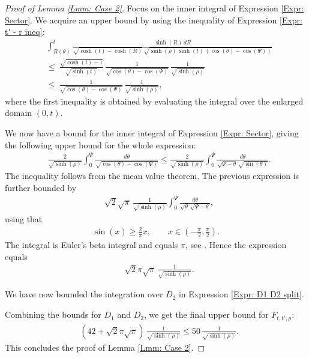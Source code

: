\documentclass[11pt,twoside,reqno]{amsart} \usepackage{a4wide} \usepackage[T1]{fontenc} \usepackage[utf8]{inputenc} \usepackage{soul}  \usepackage{amsmath} \usepackage{amsfonts} \usepackage{amssymb} \usepackage{mathtools} \usepackage{amsthm} \usepackage{xcolor} \usepackage{graphicx} \usepackage{hyperref} \usepackage{standalone} \usepackage{esint} \usepackage{comment} \usepackage[left=2.3cm,top=3cm,right=2.3cm]{geometry} \usepackage{bm} \usepackage{svg} \usepackage{float} \numberwithin{equation}{section} \theoremstyle{plain} \newtheorem{thm}{Theorem}[section] \newtheorem{theorem}[thm]{Theorem} \newtheorem*{theorem*}{Theorem}\newtheorem{conj}[thm]{Conjecture} \newtheorem{lemma}[thm]{Lemma} \newtheorem{prop}[thm]{Proposition} \newtheorem{proposition}[thm]{Proposition} \newtheorem{cor}[thm]{Corollary} \newtheorem{question}[thm]{Question} \newtheorem{corollary}[thm]{Corollary} \newtheorem{assumption}[thm]{Assumption} \theoremstyle{definition} \newtheorem{defn}[thm]{Definition} \newtheorem{choice}[thm]{Choice} \newtheorem{definition}[thm]{Definition} \newtheorem{ex}[thm]{Example} \newtheorem{notation}[thm]{Notation} \newtheorem*{ack}{Acknowledgements} \theoremstyle{remark} \newtheorem{remark}[thm]{Remark} \newtheorem{bigremark}[thm]{Remark} \usepackage{xcolor} \newcommand{\red}[1]{ {\color{Red}#1} } \newcommand{\blue}[1]{ {\color{Blue}#1} } \author{Kai Hippi} \address{Aalto University, Espoo, Finland} \email{kai.hippi@aalto.fi}
\begin{document}
\begin{proof}[Proof of Lemma \ref{Lmm: Case 2}]
Focus on the inner integral of Expression \eqref{Expr: Sector}. We acquire an upper bound by using the inequality of Expression \eqref{Expr: t' - r ineq}:
\begin{align*}
	&
	\int_{ R( \theta ) }^{ t } \frac{ \sinh( R ) \, dR }{ \sqrt{ \cosh( t ) - \cosh( R ) } \, \sqrt{ \sinh( \rho ) \, \sinh( t ) \, ( \cos( \theta ) - \cos( \Psi ) ) } } 
	\\
	& \leq \ 
	\frac{  \sqrt{ \cosh( t ) - 1 } }{ \sqrt{ \sinh( t ) } } \, \frac{1}{\sqrt{ \cos( \theta ) - \cos( \Psi ) }} \, \frac{1}{\sqrt{ \sinh( \rho )}}
	\\
	& \leq \
	\frac{1}{\sqrt{ \cos( \theta ) - \cos( \Psi ) }} \, \frac{1}{\sqrt{ \sinh( \rho ) }},
\end{align*}
where the first inequality is obtained by evaluating the integral over the enlarged domain $ (0,t) $.

We now have a bound for the inner integral of Expression \eqref{Expr: Sector}, giving the following upper bound for the whole expression:
\begin{align*}
	&
	\frac{2}{\sqrt{ \sinh( \rho ) }} \int_{0}^{\Psi} \frac{d\theta}{ \sqrt{ \cos( \theta ) - \cos( \Psi ) } } \leq \frac{2}{\sqrt{ \sinh( \rho ) }} \int_{0}^{\Psi} \frac{ d\theta }{ \sqrt{ \Psi - \theta } \, \sqrt{ \sin( \theta ) } } .
\end{align*}
The inequality follows from the mean value theorem. The previous expression is further bounded by
\begin{align*}
	&
	\sqrt{2} \sqrt{\pi} \, \frac{1}{\sqrt{ \sinh( \rho ) }} \int_{0}^{\Psi} \frac{ d\theta }{\sqrt{  \theta} \, \sqrt{ \Psi - \theta } },
\end{align*}
using that
\begin{align*}
	\sin( x ) \geq \frac{2}{\pi} x, \qquad x \in ( - \frac{\pi}{2}, \frac{\pi}{2} ).
\end{align*}
The integral is Euler's beta integral and equals $ \pi $, see \cite[Chp. 5.12.]{Loz03}. Hence the expression equals
\begin{align*}
	&
	\sqrt{2} \pi \sqrt{\pi} \, \frac{1}{\sqrt{ \sinh( \rho ) }}.
\end{align*}

We have now bounded the integration over $ D_{2} $ in Expression \eqref{Expr: D1 D2 split}.

Combining the bounds for $ D_{1} $ and $ D_{2} $, we get the final upper bound for $ F_{t,t',\rho} $:
\begin{align*}
	&
	( 42 + \sqrt{2} \pi \sqrt{\pi} ) \, \frac{1}{\sqrt{ \sinh( \rho ) }} \leq 50 \, \frac{1}{\sqrt{ \sinh( \rho ) }}.
\end{align*}
This concludes the proof of Lemma \ref{Lmm: Case 2}.

\end{proof}
\end{document}
